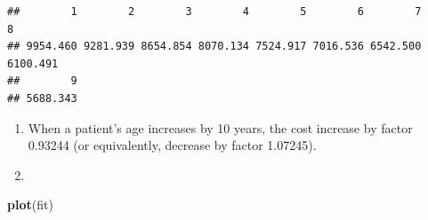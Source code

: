 \documentclass[
]{article}
\newenvironment{Shaded}{\begin{snugshade}}{\end{snugshade}}
\newcommand{\KeywordTok}[1]{\textcolor[rgb]{0.13,0.29,0.53}{\textbf{#1}}}
\newcommand{\NormalTok}[1]{#1}
\begin{document}
\begin{verbatim}
##        1        2        3        4        5        6        7        8 
## 9954.460 9281.939 8654.854 8070.134 7524.917 7016.536 6542.500 6100.491 
##        9 
## 5688.343
\end{verbatim}

\begin{enumerate}
\def\labelenumi{\roman{enumi})}
\item
  When a patient's age increases by 10 years, the cost increase by
  factor 0.93244 (or equivalently, decrease by factor 1.07245).
\item
\end{enumerate}

\begin{Shaded}
\begin{Highlighting}[]
\KeywordTok{plot}\NormalTok{(fit)}
\end{Highlighting}
\end{Shaded}
\end{document}
